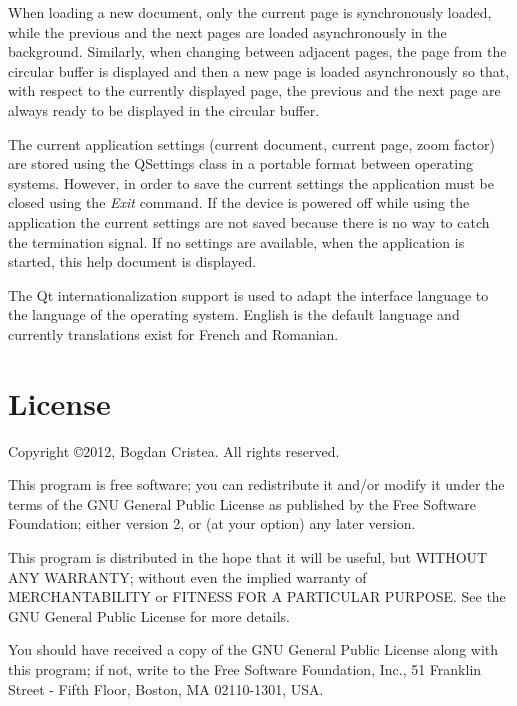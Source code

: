 \documentclass[journal,12pt]{IEEEtran}
\begin{document}
When loading a new document, only the current page is synchronously loaded, while the previous and the next pages are loaded asynchronously in the background. Similarly, when changing between adjacent pages, the page from the circular buffer is displayed and then a new page is loaded asynchronously so that, with respect to the currently displayed page, the previous and the next page are always ready to be displayed in the circular buffer.

The current application settings (current document, current page, zoom factor) are stored using the \textrm{QSettings} class in a portable format between operating systems. However, in order to save the current settings the application must be closed using the \textit{Exit} command. If the device is powered off while using the application the current settings are not saved because there is no way to catch the termination signal. If no settings are available, when the application is started, this help document is displayed.

The Qt internationalization support is used to adapt the interface language to the language of the operating system. English is the default language and currently translations exist for French and Romanian.

\section{License}
 Copyright \copyright 2012, Bogdan Cristea. All rights reserved.
 
 This program is free software; you can redistribute it and/or modify  it under the terms of the GNU General Public License as published by  the Free Software Foundation; either version 2, or (at your option)  any later version.
 
 This program is distributed in the hope that it will be useful,  but WITHOUT ANY WARRANTY; without even the implied warranty of
 MERCHANTABILITY or FITNESS FOR A PARTICULAR PURPOSE.  See the  GNU General Public License for more details.
 
 You should have received a copy of the GNU General Public License along with this program; if not, write to the Free Software
 Foundation, Inc., 51 Franklin Street - Fifth Floor, Boston, MA 02110-1301, USA.
\end{document}
